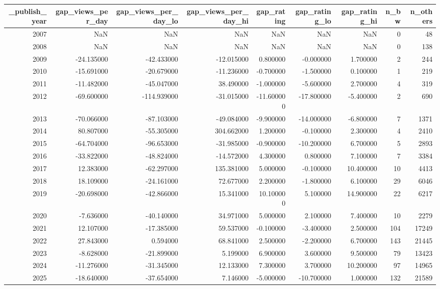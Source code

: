 \begin{tabular}{rrrrrrrrr}
\toprule
_publish_year & gap_views_per_day & gap_views_per_day_lo & gap_views_per_day_hi & gap_rating & gap_rating_lo & gap_rating_hi & n_bw & n_others \\
\midrule
2007 & NaN & NaN & NaN & NaN & NaN & NaN & 0 & 48 \\
2008 & NaN & NaN & NaN & NaN & NaN & NaN & 0 & 138 \\
2009 & -24.135000 & -42.433000 & -12.015000 & 0.800000 & -0.000000 & 1.700000 & 2 & 244 \\
2010 & -15.691000 & -20.679000 & -11.236000 & -0.700000 & -1.500000 & 0.100000 & 1 & 219 \\
2011 & -11.482000 & -45.047000 & 38.490000 & -1.000000 & -5.600000 & 2.700000 & 4 & 319 \\
2012 & -69.600000 & -114.939000 & -31.015000 & -11.600000 & -17.800000 & -5.400000 & 2 & 690 \\
2013 & -70.066000 & -87.103000 & -49.084000 & -9.900000 & -14.000000 & -6.800000 & 7 & 1371 \\
2014 & 80.807000 & -55.305000 & 304.662000 & 1.200000 & -0.100000 & 2.300000 & 4 & 2410 \\
2015 & -64.704000 & -96.653000 & -31.985000 & -0.900000 & -10.200000 & 6.700000 & 5 & 2893 \\
2016 & -33.822000 & -48.824000 & -14.572000 & 4.300000 & 0.800000 & 7.100000 & 7 & 3384 \\
2017 & 12.383000 & -62.297000 & 135.381000 & 5.000000 & -0.100000 & 10.400000 & 10 & 4413 \\
2018 & 18.109000 & -24.161000 & 72.677000 & 2.200000 & -1.800000 & 6.100000 & 29 & 6046 \\
2019 & -20.698000 & -42.866000 & 15.341000 & 10.100000 & 5.100000 & 14.900000 & 22 & 6217 \\
2020 & -7.636000 & -40.140000 & 34.971000 & 5.000000 & 2.100000 & 7.400000 & 10 & 2279 \\
2021 & 12.107000 & -17.385000 & 59.537000 & -0.100000 & -3.400000 & 2.500000 & 104 & 17249 \\
2022 & 27.843000 & 0.594000 & 68.841000 & 2.500000 & -2.200000 & 6.700000 & 143 & 21445 \\
2023 & -8.628000 & -21.899000 & 5.199000 & 6.900000 & 3.600000 & 9.500000 & 79 & 13423 \\
2024 & -11.276000 & -31.345000 & 12.133000 & 7.300000 & 3.700000 & 10.200000 & 97 & 14965 \\
2025 & -18.640000 & -37.654000 & 7.146000 & -5.000000 & -10.700000 & 1.000000 & 132 & 21589 \\
\bottomrule
\end{tabular}
